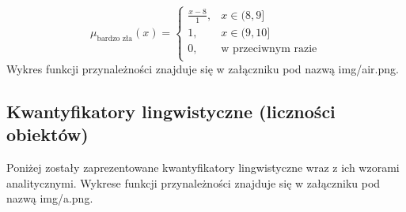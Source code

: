 \documentclass{article}
\begin{document}
\begin{enumerate}
                \begin{equation}
                    \mu_{\text{bardzo zła}}(x) =
                    \begin{cases}
                    \frac{x - 8}{1}, &  x \in (8, 9] \\
                    1, & x \in (9, 10] \\
                    0, & \text{w przeciwnym razie} \\
                    \end{cases}
                \end{equation}
Wykres funkcji przynależności znajduje się w załączniku pod nazwą img/air.png.
\end{enumerate}

\subsection{Kwantyfikatory lingwistyczne (liczności obiektów)}
Poniżej zostały zaprezentowane kwantyfikatory lingwistyczne wraz z ich wzorami analitycznymi. Wykrese funkcji przynależności znajduje się w załączniku pod nazwą img/a.png.
\end{document}
